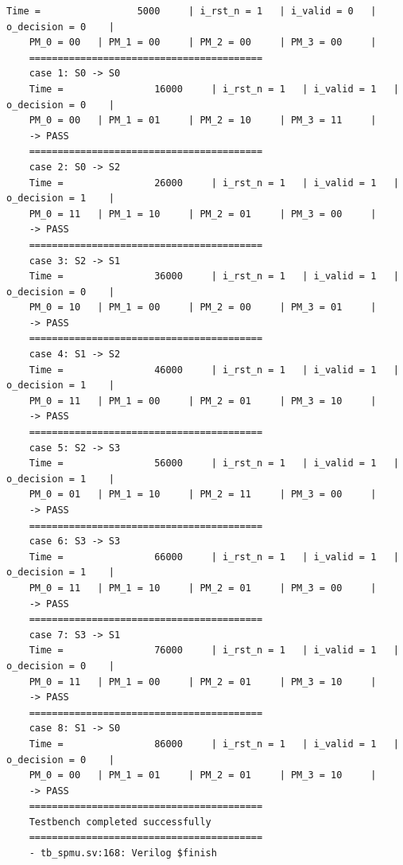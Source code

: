 \begin{lstlisting}[style=StyleResult, language=Result, caption={The result of testing SPMU}]
	Time =                 5000 	| i_rst_n = 1 	| i_valid = 0 	| o_decision = 0 	|
	PM_0 = 00 	| PM_1 = 00 	| PM_2 = 00 	| PM_3 = 00 	|
	=========================================
	case 1: S0 -> S0
	Time =                16000 	| i_rst_n = 1 	| i_valid = 1 	| o_decision = 0 	|
	PM_0 = 00 	| PM_1 = 01 	| PM_2 = 10 	| PM_3 = 11 	|
	-> PASS
	=========================================
	case 2: S0 -> S2
	Time =                26000 	| i_rst_n = 1 	| i_valid = 1 	| o_decision = 1 	|
	PM_0 = 11 	| PM_1 = 10 	| PM_2 = 01 	| PM_3 = 00 	|
	-> PASS
	=========================================
	case 3: S2 -> S1
	Time =                36000 	| i_rst_n = 1 	| i_valid = 1 	| o_decision = 0 	|
	PM_0 = 10 	| PM_1 = 00 	| PM_2 = 00 	| PM_3 = 01 	|
	-> PASS
	=========================================
	case 4: S1 -> S2
	Time =                46000 	| i_rst_n = 1 	| i_valid = 1 	| o_decision = 1 	|
	PM_0 = 11 	| PM_1 = 00 	| PM_2 = 01 	| PM_3 = 10 	|
	-> PASS
	=========================================
	case 5: S2 -> S3
	Time =                56000 	| i_rst_n = 1 	| i_valid = 1 	| o_decision = 1 	|
	PM_0 = 01 	| PM_1 = 10 	| PM_2 = 11 	| PM_3 = 00 	|
	-> PASS
	=========================================
	case 6: S3 -> S3
	Time =                66000 	| i_rst_n = 1 	| i_valid = 1 	| o_decision = 1 	|
	PM_0 = 11 	| PM_1 = 10 	| PM_2 = 01 	| PM_3 = 00 	|
	-> PASS
	=========================================
	case 7: S3 -> S1
	Time =                76000 	| i_rst_n = 1 	| i_valid = 1 	| o_decision = 0 	|
	PM_0 = 11 	| PM_1 = 00 	| PM_2 = 01 	| PM_3 = 10 	|
	-> PASS
	=========================================
	case 8: S1 -> S0
	Time =                86000 	| i_rst_n = 1 	| i_valid = 1 	| o_decision = 0 	|
	PM_0 = 00 	| PM_1 = 01 	| PM_2 = 01 	| PM_3 = 10 	|
	-> PASS
	=========================================
	Testbench completed successfully
	=========================================
	- tb_spmu.sv:168: Verilog $finish
\end{lstlisting}
